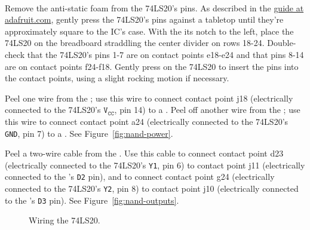 \disconnect\

Remove the anti-static foam from the 74LS20's pins. As described in the
\href{https://learn.adafruit.com/breadboards-for-beginners/breadboard-usage}{guide
at adafruit.com}, gently press the 74LS20's pins against a tabletop until
they're approximately square to the IC's case. With the its notch to the left,
place the 74LS20 on the breadboard straddling the center divider on rows 18-24.
Double-check that the 74LS20's pins 1-7 are on contact points e18-e24 and that
pins 8-14 are on contact points f24-f18. Gently press on the 74LS20 to insert
the pins into the contact points, using a slight rocking motion if necessary.

Peel one wire from the \rainbow; use this wire to connect contact point j18
(electrically connected to the 74LS20's $\mathtt{V_{CC}}$, pin 14) to a \power.
Peel off another wire from the \rainbow; use this wire to connect contact point
a24 (electrically connected to the 74LS20's \texttt{GND}, pin 7) to a \ground.
See Figure~\ref{fig:nand-power}.

Peel a two-wire cable from the \rainbow. Use this cable to connect contact
point d23 (electrically connected to the 74LS20's \texttt{Y1}, pin 6) to
contact point j11 (electrically connected to the \nano's \texttt{D2} pin), and
to connect contact point g24 (electrically connected to the 74LS20's
\texttt{Y2}, pin 8) to contact point j10 (electrically connected to the
\nano's \texttt{D3} pin). See Figure~\ref{fig:nand-outputs}.

\begin{figure}
    \centering
    \hfil
    \caption{Wiring the 74LS20.}
\end{figure}

